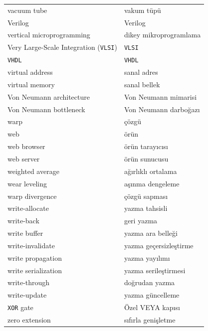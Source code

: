 {\begin{longtable}{@{}p{7.6cm}p{7.6cm}@{}}
vacuum tube & vakum tüpü \\
Verilog & Verilog \\
vertical microprogramming & dikey mikroprogramlama \\
Very Large-Scale Integration (\texttt{VLSI}) & \texttt{VLSI} \\
\texttt{VHDL} & \texttt{VHDL} \\
virtual address & sanal adres \\
virtual memory & sanal bellek \\
Von Neumann architecture & Von Neumann mimarisi \\
Von Neumann bottleneck & Von Neumann darboğazı \\

warp & çözgü \\
web & örün \\
web browser & örün tarayıcısı \\
web server & örün sunucusu \\
weighted average & ağırlıklı ortalama \\
wear leveling & aşınma dengeleme \\
warp divergence & çözgü sapması \\
write-allocate & yazma tahsisli \\
write-back & geri yazma \\
write buffer & yazma ara belleği \\
write-invalidate & yazma geçersizleştirme \\
write propagation & yazma yayılımı \\
write serialization & yazma serileştirmesi \\
write-through & doğrudan yazma \\
write-update & yazma güncelleme \\

\texttt{XOR} gate & Özel VEYA kapısı \\

zero extension & sıfırla genişletme \\

\end{longtable}
}

